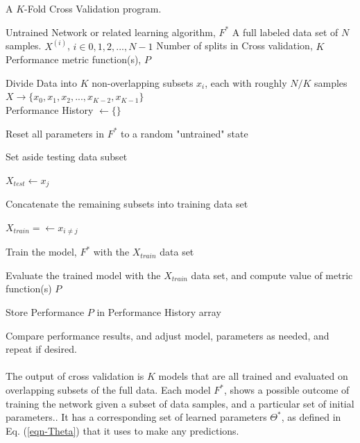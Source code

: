 \documentclass[12pt,letterpaper]{article}
\begin{document}
\begin{algorithm}[H]
\caption{A $K$-Fold Cross Validation program.}
\label{algFeedForward}

\begin{algorithmic}
\REQUIRE Untrained Network or related learning algorithm, $F^*$
\REQUIRE A full labeled data set of $N$ samples. $X^{(i)}$, $i \in {0,1,2,...,N-1}$
\REQUIRE Number of splits in Cross validation, $K$
\REQUIRE Performance metric function(s), $P$

Divide Data into $K$ non-overlapping subsets $x_{i}$, each with roughly $N/K$ samples \\
$X \rightarrow \big\{ x_{0}, x_{1}, x_{2}, ..., x_{K-2},  x_{K-1} \big\}$ \\
Performance History $\leftarrow \{\}$

	\item Reset all parameters in $F^*$ to a random "untrained" state
	\item Set aside testing data subset
	\item $X_{test} \leftarrow x_{j}$
	\item Concatenate the remaining subsets into training data set
	\item $X_{train} =\leftarrow x_{i \neq j}$
	\item Train the model, $F^*$ with the $X_{train}$ data set
	\item Evaluate the trained model with the $X_{train}$ data set, and compute value of metric function(s) $P$
	\item Store Performance $P$ in Performance History array
\ENDFOR

Compare performance results, and adjust model, parameters as needed, and repeat if desired.

\end{algorithmic}
\end{algorithm}

\paragraph*{}The output of cross validation is $K$ models that are all trained and evaluated on overlapping subsets of the full data. Each model $F^*$, shows a possible outcome of training the network given a subset of data samples, and a particular set of initial parameters.. It has a corresponding set of learned parameters $\Theta^*$, as defined in Eq. (\ref{eqn-Theta}) that it uses to make any predictions. 
\end{document}
